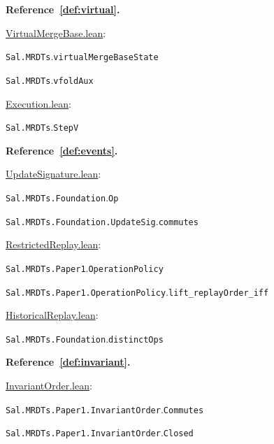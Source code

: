 \medskip\noindent\textbf{Reference~\ref{def:virtual}.}\par\nobreak
\noindent\href{https://github.com/fplaunchpad/sal/blob/07fe525/Sal/MRDTs/Metatheory/VirtualMergeBase.lean}{VirtualMergeBase.lean}:\par
{\small\nolinkurl{Sal.MRDTs}.\allowbreak\nolinkurl{virtualMergeBaseState}}\par
{\small\nolinkurl{Sal.MRDTs}.\allowbreak\nolinkurl{vfoldAux}}\par
\noindent\href{https://github.com/fplaunchpad/sal/blob/07fe525/Sal/MRDTs/Framework/Execution.lean}{Execution.lean}:\par
{\small\nolinkurl{Sal.MRDTs}.\allowbreak\nolinkurl{StepV}}\par

\medskip\noindent\textbf{Reference~\ref{def:events}.}\par\nobreak
\noindent\href{https://github.com/fplaunchpad/sal/blob/paper1/Sal/MRDTs/Framework/Base/UpdateSignature.lean}{UpdateSignature.lean}:\par
{\small\nolinkurl{Sal.MRDTs.Foundation}.\allowbreak\nolinkurl{Op}}\par
{\small\nolinkurl{Sal.MRDTs.Foundation.UpdateSig}.\allowbreak\nolinkurl{commutes}}\par
\noindent\href{https://github.com/fplaunchpad/sal/blob/paper1/Sal/MRDTs/Paper1/RestrictedReplay.lean}{RestrictedReplay.lean}:\par
{\small\nolinkurl{Sal.MRDTs.Paper1}.\allowbreak\nolinkurl{OperationPolicy}}\par
{\small\nolinkurl{Sal.MRDTs.Paper1.OperationPolicy}.\allowbreak\nolinkurl{lift_replayOrder_iff}}\par
\noindent\href{https://github.com/fplaunchpad/sal/blob/paper1/Sal/MRDTs/Metatheory/Join/HistoricalReplay.lean}{HistoricalReplay.lean}:\par
{\small\nolinkurl{Sal.MRDTs.Foundation}.\allowbreak\nolinkurl{distinctOps}}\par

\medskip\noindent\textbf{Reference~\ref{def:invariant}.}\par\nobreak
\noindent\href{https://github.com/fplaunchpad/sal/blob/07fe525/Sal/MRDTs/Paper1/InvariantOrder.lean}{InvariantOrder.lean}:\par
{\small\nolinkurl{Sal.MRDTs.Paper1.InvariantOrder}.\allowbreak\nolinkurl{Commutes}}\par
{\small\nolinkurl{Sal.MRDTs.Paper1.InvariantOrder}.\allowbreak\nolinkurl{Closed}}\par

